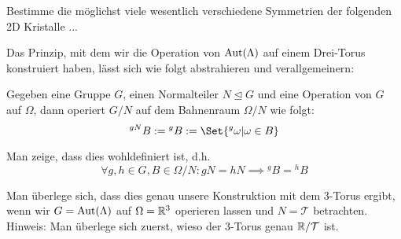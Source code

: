 \begin{sheet}

\begin{problem}
Bestimme die möglichst viele wesentlich verschiedene Symmetrien der folgenden 2D Kristalle ...
\end{problem}

\begin{problem}[difficulty={fortgeschritten}]
Das Prinzip, mit dem wir die Operation von $\operatorname{Aut}(\Lambda)$ auf einem Drei-Torus konstruiert haben, lässt sich wie folgt abstrahieren und verallgemeinern:

Gegeben eine Gruppe $G$, einen Normalteiler $N\unlhd G$ und eine Operation von $G$ auf $\Omega$, dann operiert $G/N$ auf dem Bahnenraum $\Omega/N$ wie folgt:
\[{^{gN} B} := {^g B} := \Set{{^g \omega} | \omega\in B}\]
\begin{subproblem}[difficulty={einfach}]
Man zeige, dass dies wohldefiniert ist, d.h.
\[\forall g,h\in G, B\in\Omega/N: gN=hN \implies {^g B} = {^h B}\]
\end{subproblem}
\begin{subproblem}[difficulty={mittel}]
Man überlege sich, dass dies genau unsere Konstruktion mit dem 3-Torus ergibt, wenn wir $G=\operatorname{Aut}(\Lambda)$ auf $\Omega=\mathbb{R}^3$ operieren lassen und $N=\mathcal{T}$ betrachten. Hinweis: Man überlege sich zuerst, wieso der 3-Torus genau $\mathbb{R} / \mathcal{T}$ ist.
\end{subproblem}
\end{problem}

\end{sheet}